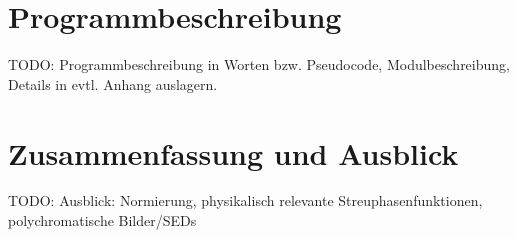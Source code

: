 \documentclass[12pt,a4paper,DIVcalc,titlepage,twoside]{scrbook}
\begin{document}
	\chapter{Programmbeschreibung}
	TODO: Programmbeschreibung in Worten bzw. Pseudocode, Modulbeschreibung, Details in evtl. Anhang auslagern.
	
	\chapter{Zusammenfassung und Ausblick}
	TODO: Ausblick: Normierung, physikalisch relevante Streuphasenfunktionen, polychromatische Bilder/SEDs

	
	
\end{document}
